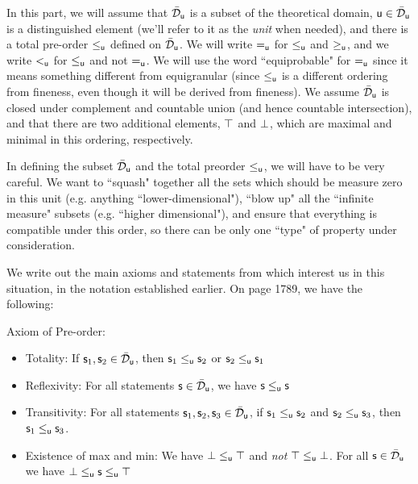 \documentclass{article}
\begin{document}
In this part, we will assume that $\tdomain_{\stmt[u]}$ is a subset of the theoretical domain, $\stmt[u]\in \tdomain_{\stmt[u]}$ is a distinguished element (we'll refer to it as the \emph{unit} when needed), and there is a total pre-order $\leq_{\stmt[u]}$ defined on $\tdomain_{\stmt[u]}$. We will write $=_{\stmt[u]}$ for $\leq_{\stmt[u]}$ and $\geq_{\stmt[u]}$, and we write $<_{\stmt[u]}$ for $\leq_{\stmt[u]}$ and not $=_{\stmt[u]}$. We will use the word ``equiprobable" for $=_{\stmt[u]}$ since it means something different from equigranular (since $\leq_{\stmt[u]}$ is a different ordering from fineness, even though it will be derived from fineness). We assume $\tdomain_{\stmt[u]}$ is closed under complement and countable union (and hence countable intersection), and that there are two additional elements, $\certainty$ and $\impossibility$, which are maximal and minimal in this ordering, respectively.

\begin{remark}
In defining the subset $\tdomain_{\stmt[u]}$ and the total preorder $\leq_{\stmt[u]}$, we will have to be very careful. We want to ``squash" together all the sets which should be measure zero in this unit (e.g. anything ``lower-dimensional"), ``blow up" all the ``infinite measure" subsets (e.g. ``higher dimensional"), and ensure that everything is compatible under this order, so there can be only one ``type" of property under consideration. 
\end{remark}

We write out the main axioms and statements from \cite{villegas} which interest us in this situation, in the notation established earlier. On page 1789, we have the following:

Axiom of Pre-order:
\begin{itemize}
    \item Totality: If $\stmt_1,\stmt_2\in \tdomain_{\stmt[u]}$, then $\stmt_1 \leq_{\stmt[u]} \stmt_2$ or $\stmt_2\leq_{\stmt[u]} \stmt_1$
    \item Reflexivity: For all statements $\stmt\in \tdomain_{\stmt[u]}$, we have $\stmt\leq_{\stmt[u]}\stmt$
    \item Transitivity: For all statements $\stmt_1,\stmt_2,\stmt_3\in \tdomain_{\stmt[u]}$, if $\stmt_1\leq_{\stmt[u]}\stmt_2$ and $\stmt_2\leq_{\stmt[u]}\stmt_3$, then $\stmt_1\leq_{\stmt[u]}\stmt_3$.
    \item Existence of max and min: We have $\impossibility\leq_{\stmt[u]}\certainty$ and \emph{not} $\certainty\leq_{\stmt[u]}\impossibility$. For all $\stmt\in \tdomain_{\stmt[u]}$ we have $\impossibility\leq_{\stmt[u]}\stmt\leq_{\stmt[u]}\certainty$
\end{itemize}
\end{document}
